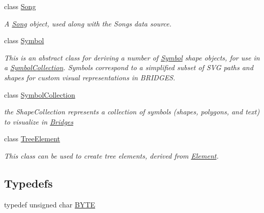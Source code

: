 \begin{DoxyCompactItemize}
class \mbox{\hyperlink{classbridges_1_1_song}{Song}}
\begin{DoxyCompactList}\small\item\em A \mbox{\hyperlink{classbridges_1_1_song}{Song}} object, used along with the Songs data source. \end{DoxyCompactList}\item 
class \mbox{\hyperlink{classbridges_1_1_symbol}{Symbol}}
\begin{DoxyCompactList}\small\item\em This is an abstract class for deriving a number of \mbox{\hyperlink{classbridges_1_1_symbol}{Symbol}} shape objects, for use in a \mbox{\hyperlink{classbridges_1_1_symbol_collection}{Symbol\+Collection}}. Symbols correspond to a simplified subset of S\+VG paths and shapes for custom visual representations in B\+R\+I\+D\+G\+ES. \end{DoxyCompactList}\item 
class \mbox{\hyperlink{classbridges_1_1_symbol_collection}{Symbol\+Collection}}
\begin{DoxyCompactList}\small\item\em the Shape\+Collection represents a collection of symbols (shapes, polygons, and text) to visualize in \mbox{\hyperlink{classbridges_1_1_bridges}{Bridges}} \end{DoxyCompactList}\item 
class \mbox{\hyperlink{classbridges_1_1_tree_element}{Tree\+Element}}
\begin{DoxyCompactList}\small\item\em This class can be used to create tree elements, derived from \mbox{\hyperlink{classbridges_1_1_element}{Element}}. \end{DoxyCompactList}\end{DoxyCompactItemize}
\subsection*{Typedefs}
\begin{DoxyCompactItemize}
\item 
typedef unsigned char \mbox{\hyperlink{namespacebridges_a59b77ee45243ba85c701fb8ab298ef00}{B\+Y\+TE}}
\end{DoxyCompactItemize}
